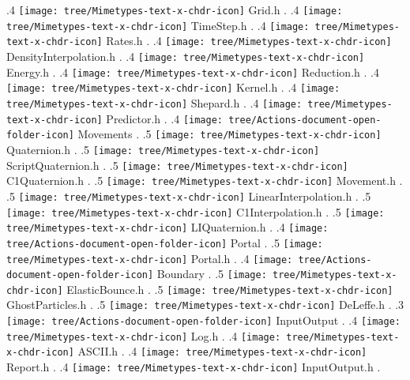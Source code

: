{.4 { \texttt{[image: tree/Mimetypes-text-x-chdr-icon]} Grid.h }.
.4 { \texttt{[image: tree/Mimetypes-text-x-chdr-icon]} TimeStep.h }.
.4 { \texttt{[image: tree/Mimetypes-text-x-chdr-icon]} Rates.h }.
.4 { \texttt{[image: tree/Mimetypes-text-x-chdr-icon]} DensityInterpolation.h }.
.4 { \texttt{[image: tree/Mimetypes-text-x-chdr-icon]} Energy.h }.
.4 { \texttt{[image: tree/Mimetypes-text-x-chdr-icon]} Reduction.h }.
.4 { \texttt{[image: tree/Mimetypes-text-x-chdr-icon]} Kernel.h }.
.4 { \texttt{[image: tree/Mimetypes-text-x-chdr-icon]} Shepard.h }.
.4 { \texttt{[image: tree/Mimetypes-text-x-chdr-icon]} Predictor.h }.
.4 { \texttt{[image: tree/Actions-document-open-folder-icon]} Movements }.
.5 { \texttt{[image: tree/Mimetypes-text-x-chdr-icon]} Quaternion.h }.
.5 { \texttt{[image: tree/Mimetypes-text-x-chdr-icon]} ScriptQuaternion.h }.
.5 { \texttt{[image: tree/Mimetypes-text-x-chdr-icon]} C1Quaternion.h }.
.5 { \texttt{[image: tree/Mimetypes-text-x-chdr-icon]} Movement.h }.
.5 { \texttt{[image: tree/Mimetypes-text-x-chdr-icon]} LinearInterpolation.h }.
.5 { \texttt{[image: tree/Mimetypes-text-x-chdr-icon]} C1Interpolation.h }.
.5 { \texttt{[image: tree/Mimetypes-text-x-chdr-icon]} LIQuaternion.h }.
.4 { \texttt{[image: tree/Actions-document-open-folder-icon]} Portal }.
.5 { \texttt{[image: tree/Mimetypes-text-x-chdr-icon]} Portal.h }.
.4 { \texttt{[image: tree/Actions-document-open-folder-icon]} Boundary }.
.5 { \texttt{[image: tree/Mimetypes-text-x-chdr-icon]} ElasticBounce.h }.
.5 { \texttt{[image: tree/Mimetypes-text-x-chdr-icon]} GhostParticles.h }.
.5 { \texttt{[image: tree/Mimetypes-text-x-chdr-icon]} DeLeffe.h }.
.3 { \texttt{[image: tree/Actions-document-open-folder-icon]} InputOutput }.
.4 { \texttt{[image: tree/Mimetypes-text-x-chdr-icon]} Log.h }.
.4 { \texttt{[image: tree/Mimetypes-text-x-chdr-icon]} ASCII.h }.
.4 { \texttt{[image: tree/Mimetypes-text-x-chdr-icon]} Report.h }.
.4 { \texttt{[image: tree/Mimetypes-text-x-chdr-icon]} InputOutput.h }.
}
